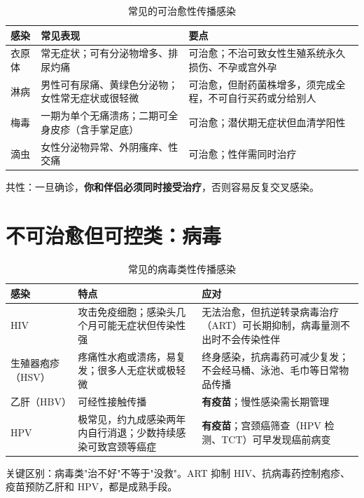\begin{table}[htbp]
  \centering
  \caption{常见的可治愈性传播感染}
  \begin{tabularx}{\textwidth}{@{}l X X@{}}
    \toprule
    \textbf{感染} & \textbf{常见表现} & \textbf{要点} \\
    \midrule
    衣原体 & 常无症状；可有分泌物增多、排尿灼痛 & 可治愈；不治可致女性生殖系统永久损伤、不孕或宫外孕 \\
    淋病 & 男性可有尿痛、黄绿色分泌物；女性常无症状或很轻微 & 可治愈，但耐药菌株增多，须完成全程，不可自行买药或分给别人 \\
    梅毒 & 一期为单个无痛溃疡；二期可全身皮疹（含手掌足底） & 可治愈；潜伏期无症状但血清学阳性 \\
    滴虫 & 女性分泌物异常、外阴瘙痒、性交痛 & 可治愈；性伴需同时治疗 \\
    \bottomrule
  \end{tabularx}
\end{table}

\noindent 共性：一旦确诊，\textbf{你和伴侣必须同时接受治疗}，否则容易反复交叉感染。

\section{不可治愈但可控类：病毒}

\begin{table}[htbp]
  \centering
  \caption{常见的病毒类性传播感染}
  \begin{tabularx}{\textwidth}{@{}l X X@{}}
    \toprule
    \textbf{感染} & \textbf{特点} & \textbf{应对} \\
    \midrule
    HIV & 攻击免疫细胞；感染头几个月可能无症状但传染性强 & 无法治愈，但抗逆转录病毒治疗（ART）可长期抑制，病毒量测不出时不会传染性伴 \\
    生殖器疱疹（HSV） & 疼痛性水疱或溃疡，易复发；很多人无症状或极轻微 & 终身感染，抗病毒药可减少复发；不会经马桶、泳池、毛巾等日常物品传播 \\
    乙肝（HBV） & 可经性接触传播 & \textbf{有疫苗}；慢性感染需长期管理 \\
    HPV & 极常见，约九成感染两年内自行消退；少数持续感染可致宫颈等癌症 & \textbf{有疫苗}；宫颈癌筛查（HPV 检测、TCT）可早发现癌前病变 \\
    \bottomrule
  \end{tabularx}
\end{table}

\noindent 关键区别：病毒类"治不好"不等于"没救"。ART 抑制 HIV、抗病毒药控制疱疹、
疫苗预防乙肝和 HPV，都是成熟手段。

